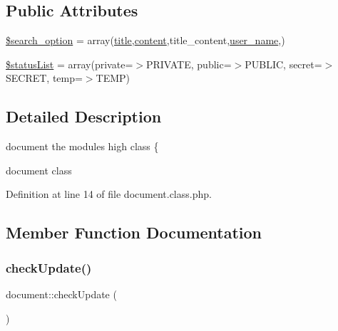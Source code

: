 \subsection*{Public Attributes}
\begin{DoxyCompactItemize}
\item 
\hyperlink{classdocument_adfef00d8f028ef4dfe991de199009d46}{\$search\+\_\+option} = array(\textquotesingle{}\hyperlink{ko_8install_8php_a5b072c5fd1d2228c6ba5cee13cd142e3}{title}\textquotesingle{},\textquotesingle{}\hyperlink{classcontent}{content}\textquotesingle{},\textquotesingle{}title\+\_\+content\textquotesingle{},\textquotesingle{}\hyperlink{ko_8install_8php_a115401aff7da80e73c66e9f76505426b}{user\+\_\+name}\textquotesingle{},)
\item 
\hyperlink{classdocument_a93e1c85a4ec17a1471b874fdb14cce58}{\$status\+List} = array(\textquotesingle{}private\textquotesingle{}=$>$\textquotesingle{}P\+R\+I\+V\+A\+TE\textquotesingle{}, \textquotesingle{}public\textquotesingle{}=$>$\textquotesingle{}P\+U\+B\+L\+IC\textquotesingle{}, \textquotesingle{}secret\textquotesingle{}=$>$\textquotesingle{}S\+E\+C\+R\+ET\textquotesingle{}, \textquotesingle{}temp\textquotesingle{}=$>$\textquotesingle{}T\+E\+MP\textquotesingle{})
\end{DoxyCompactItemize}


\subsection{Detailed Description}
document the module\textquotesingle{}s high class \{ 

document class 

Definition at line 14 of file document.\+class.\+php.



\subsection{Member Function Documentation}
\hypertarget{classdocument_a71d01592758989490b56cbd6a2a92e37}{}\label{classdocument_a71d01592758989490b56cbd6a2a92e37} 
\subsubsection{\texorpdfstring{check\+Update()}{checkUpdate()}}
{\footnotesize\ttfamily document\+::check\+Update (\begin{DoxyParamCaption}{ }\end{DoxyParamCaption})}

